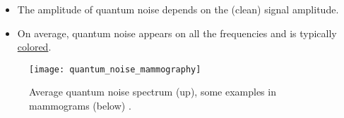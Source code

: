\label{sec:radiography_quantum_noise}
\begin{itemize}
\item The amplitude of quantum noise depends on the (clean) signal amplitude.  
\item On average, quantum noise appears on all the frequencies and is typically \href{https://en.wikipedia.org/wiki/Colors_of_noise}{colored}.
\end{itemize}
\vspace{-4ex}
\begin{figure}[!b]
  \centering
    \texttt{[image: quantum\_noise\_mammography]}
    \caption{Average quantum noise spectrum (up), some examples in mammograms (below) 
      \cite{saunders2007does}.\label{fig:quantum_noise_X-rays_spectrum}}
\end{figure}
